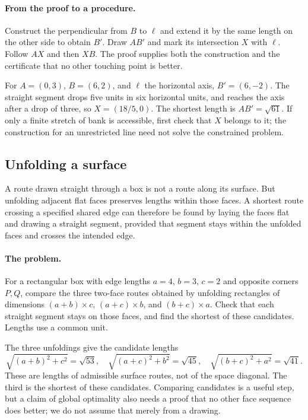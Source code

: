 \paragraph{From the proof to a procedure.}
Construct the perpendicular from $B$ to $\ell$ and extend it by the same
length on the other side to obtain $B'$. Draw $AB'$ and mark its intersection
$X$ with $\ell$. Follow $AX$ and then $XB$. The proof supplies both the
construction and the certificate that no other touching point is better.

For $A=(0,3)$, $B=(6,2)$, and $\ell$ the horizontal axis, $B'=(6,-2)$.
The straight segment drops five units in six horizontal units, and reaches
the axis after a drop of three, so $X=(18/5,0)$. The shortest length is
$AB'=\sqrt{61}$. If only a finite stretch of bank is accessible, first
check that $X$ belongs to it; the construction for an unrestricted line
need not solve the constrained problem.

\subsection{Unfolding a surface}
A route drawn straight through a box is not a route along its surface.
But unfolding adjacent flat faces preserves lengths within those faces.
A shortest route crossing a specified shared edge can therefore be found
by laying the faces flat and drawing a straight segment, provided that
segment stays within the unfolded faces and crosses the intended edge.

\paragraph{The problem.}
For a rectangular box with edge lengths $a=4$, $b=3$, $c=2$ and opposite
corners $P,Q$, compare the three two-face routes obtained by unfolding
rectangles of dimensions $(a+b)\times c$, $(a+c)\times b$, and
$(b+c)\times a$. Check that each straight segment stays on those faces,
and find the shortest of these candidates. Lengths use a common unit.

The three unfoldings give the candidate lengths
\[
\sqrt{(a+b)^2+c^2}=\sqrt{53},\quad
\sqrt{(a+c)^2+b^2}=\sqrt{45},\quad
\sqrt{(b+c)^2+a^2}=\sqrt{41}.
\]
These are lengths of admissible surface routes, not of the space diagonal.
The third is the shortest of these candidates. Comparing candidates is a
useful step, but a claim of global optimality also needs a proof that
no other face sequence does better; we do not assume that merely from a drawing.

